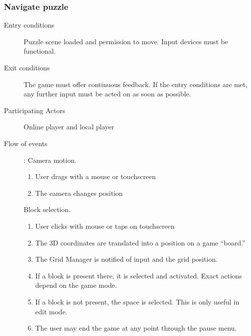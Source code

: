 \documentclass[12pt]{article}
\begin{document}
    \subsubsection{Navigate puzzle}
    \begin{description}
        \item[Entry conditions] Puzzle scene loaded and permission to move.
            Input devices must be functional.
        \item[Exit conditions] The game must offer continuous feedback.
            If the entry conditions are met, any further input must be
            acted on as soon as possible.
        \item[Participating Actors] Online player and local player
        \item[Flow of events]:
            Camera motion.
            \begin{enumerate}
                \item User drags with a mouse or touchscreen
                \item The camera changes position
            \end{enumerate}

            Block selection.
            \begin{enumerate}
                \item User clicks with mouse or taps on touchscreen
                \item The 3D coordinates are translated into a position on
                    a game ``board.''
                \item The Grid Manager is notified of input and the grid
                    position.
                \item If a block is present there, it is selected and activated.
                    Exact actions depend on the game mode.
                \item If a block is not present, the space is selected. This
                    is only useful in edit mode.
                \item The user may end the game at any point through the pause
                    menu.
            \end{enumerate}

    \end{description}


\end{document}

